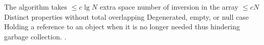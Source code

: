 %
%


 The algorithm takes $\leq c \lg N$ extra space
 number of inversion in the array $\leq cN$
 Distinct properties without total overlapping
 Degenerated, empty, or null case
 Holding a reference to an object when it is no longer needed thus hindering garbage collection. 
. 
